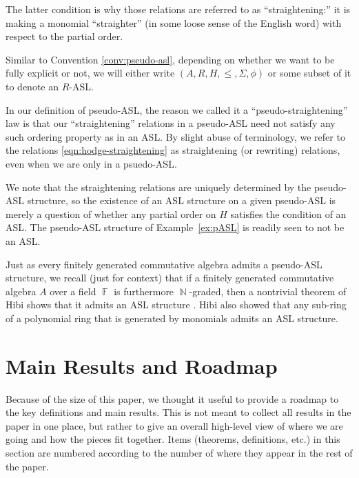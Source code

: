 \documentclass[11pt,reqno]{amsart}
\DeclareMathOperator{\N}{\mathbb{N}}
\DeclareMathOperator{\F}{\mathbb{F}}
\theoremstyle{definition}
\numberwithin{equation}{section}
\begin{document}
The latter condition is why those relations are referred to as ``straightening:'' it is making a monomial ``straighter'' (in some loose sense of the English word) with respect to the partial order.

\begin{convention}
Similar to Convention \ref{conv:pseudo-asl}, depending on whether we want to be fully explicit or not, we will either write $(A, R, H, \le, \Sigma, \phi)$ or some subset of it to denote an $R$-ASL.
\end{convention}

In our definition of pseudo-ASL, the reason we called it a ``pseudo-straightening'' law is that our ``straightening'' relations in a pseudo-ASL need not satisfy any such ordering property as in an ASL. By slight abuse of terminology, we refer to the relations \eqref{eqn:hodge-straightening} as straightening (or rewriting) relations, even when we are only in a psuedo-ASL. 

We note that the straightening relations are uniquely determined by the pseudo-ASL structure, so the existence of an ASL structure on a given pseudo-ASL is merely a question of whether any partial order on $H$ satisfies the condition of an ASL. The pseudo-ASL structure of Example~\ref{ex:pASL} is readily seen to not be an ASL.

Just as every finitely generated commutative algebra admits a pseudo-ASL structure, we recall (just for context) that if a finitely generated commutative algebra $A$ over a field $\F$ is furthermore $\N$-graded, then a nontrivial theorem of Hibi shows that it admits an ASL structure \cite{hibi}. Hibi also showed \cite{hibiSemigroup} that any sub-ring of a polynomial ring that is generated by monomials admits an ASL structure.



\section{Main Results and Roadmap}
\label{sec:roadmap}

Because of the size of this paper, we thought it useful to provide a roadmap to the key definitions and main results. This is not meant to collect all results in the paper in one place, but rather to give an overall high-level view of where we are going and how the pieces fit together. Items (theorems, definitions, etc.) in this section are numbered according to the number of where they appear in the rest of the paper. 
\end{document}
